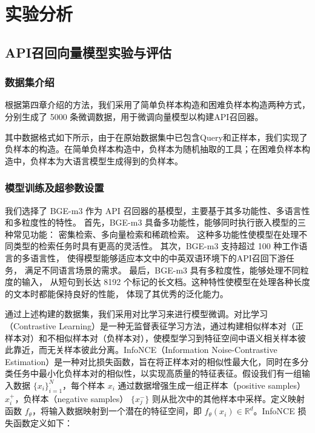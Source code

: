 \chapter{实验分析}

\section{API召回向量模型实验与评估}

\subsection{数据集介绍}

根据第四章介绍的方法，我们采用了简单负样本构造和困难负样本构造两种方式，分别生成了 5000 条微调数据，用于微调向量模型以构建API召回器。

其中数据格式如下所示，由于在原始数据集中已包含Query和正样本，我们实现了负样本的构造。在简单负样本构造中，负样本为随机抽取的工具；在困难负样本构造中，负样本为大语言模型生成得到的负样本。

\subsection{模型训练及超参数设置}

我们选择了 BGE-m3\cite{chen2024bge} 作为 API 召回器的基模型，主要基于其多功能性、多语言性和多粒度性的特性。
首先，BGE-m3 具备多功能性，能够同时执行嵌入模型的三种常见功能：
密集检索、多向量检索和稀疏检索。
这种多功能性使模型在处理不同类型的检索任务时具有更高的灵活性。
其次，BGE-m3 支持超过 100 种工作语言的多语言性，
使得模型能够适应本文中的中英双语环境下的API召回下游任务，
满足不同语言场景的需求。
最后，BGE-m3 具有多粒度性，能够处理不同粒度的输入，
从短句到长达 8192 个标记的长文档。这种特性使模型在处理各种长度的文本时都能保持良好的性能，
体现了其优秀的泛化能力。

通过上述构建的数据集，我们采用对比学习来进行模型微调。对比学习（Contrastive Learning）是一种无监督表征学习方法，通过构建相似样本对（正样本对）和不相似样本对（负样本对），使模型学习到特征空间中语义相关样本彼此靠近，而无关样本彼此分离。InfoNCE（Information Noise-Contrastive Estimation）是一种对比损失函数，旨在将正样本对的相似性最大化，同时在多分类任务中最小化负样本对的相似性，以实现高质量的特征表征。假设我们有一组输入数据 $\{x_i\}_{i=1}^N$，每个样本 $x_i$ 通过数据增强生成一组正样本（positive samples）$x_i^+$，负样本（negative samples） $\{x_j^-\}$ 则从批次中的其他样本中采样。定义映射函数 $f_{\theta}$，将输入数据映射到一个潜在的特征空间，即 $f_{\theta}(x_i) \in \mathbb{R}^d$。InfoNCE 损失函数定义如下：

